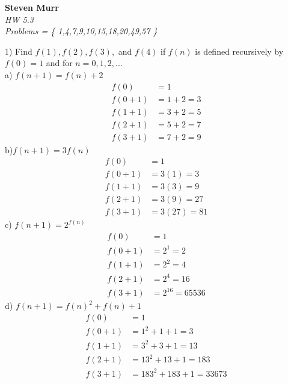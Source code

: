 \documentclass{article}
\begin{document}
\setcounter{totalnumber}{5}
   \begin{flushright}
      \Large\textbf{Steven Murr}\\
      \large\textit{HW 5.3} \\
      \large\textit{ Problems = \{ 1,4,7,9,10,15,18,20,49,57 \}}
   \end{flushright}
\begin{flushleft}
\makeatletter%
\setlength{\@fptop}{5pt}
\makeatother
\setlength\parindent{0pt}1) Find $f(1), f(2), f(3),$ and $f(4)$ if $f(n)$ is defined recursively by $f(0) = 1$ and for $n = 0,1,2,...$ \\
\setlength\parindent{24pt}a) $f(n+1) = f(n) + 2$
\begin{align*}
f(0) &= 1 \\
f(0+1) &= 1 + 2 = 3 \\
f(1 + 1) &= 3 + 2 = 5 \\
f(2 + 1) &= 5 + 2 = 7 \\
f(3 + 1) &= 7 + 2 = 9
\end{align*}
\setlength\parindent{24pt}b)$f(n+1) = 3f(n)$
\begin{align*}
f(0) &= 1 \\
f(0 + 1) &= 3(1) = 3 \\
f(1 + 1) &= 3(3) = 9 \\
f(2 + 1) &= 3(9) = 27 \\
f(3 + 1) &= 3(27) = 81
\end{align*}
\setlength\parindent{24pt}c) $f(n+1) = 2^{f(n)}$
\begin{align*}
f(0) &= 1 \\
f(0 + 1) &= 2^1 = 2 \\
f(1 + 1) &= 2^2 = 4 \\
f(2 + 1) &= 2^4 = 16 \\
f(3 + 1) &= 2^{16} = 65536
\end{align*}
\setlength\parindent{24pt}d) $f(n+1) = f(n)^2 + f(n) + 1$
\begin{align*}
f(0) &= 1 \\
f(0 + 1) &= 1^2 + 1 + 1 = 3 \\
f(1 + 1) &= 3^2 + 3 + 1 = 13 \\
f(2 + 1) &= 13^2 + 13 + 1 = 183 \\
f(3 + 1) &= 183^2 + 183 + 1 = 33673 
\end{align*}


\end{flushleft}
\end{document}
